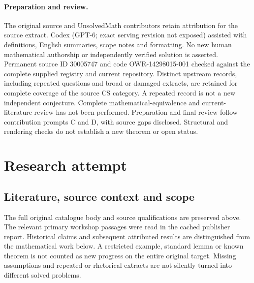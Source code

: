 \documentclass[11pt]{article}
\begin{document}
\paragraph{Preparation and review.}
The original source and UnsolvedMath contributors retain attribution for the source extract. Codex (GPT-6; exact serving revision not exposed) assisted with definitions, English summaries, scope notes and formatting. No new human mathematical authorship or independently verified solution is asserted. Permanent source ID 30005747 and code OWR-14298015-001 checked against the complete supplied registry and current repository. Distinct upstream records, including repeated questions and broad or damaged extracts, are retained for complete coverage of the source CS category. A repeated record is not a new independent conjecture. Complete mathematical-equivalence and current-literature review has not been performed. Preparation and final review follow contribution prompts C and D, with source gaps disclosed. Structural and rendering checks do not establish a new theorem or open status.
\label{end:30005747}

\section{Research attempt}
\subsection{Literature, source context and scope}
The full original catalogue body and source qualifications are preserved above. The relevant primary workshop passages were read in the cached publisher report. Historical claims and subsequent attributed results are distinguished from the mathematical work below. A restricted example, standard lemma or known theorem is not counted as new progress on the entire original target. Missing assumptions and repeated or rhetorical extracts are not silently turned into different solved problems.
\end{document}

